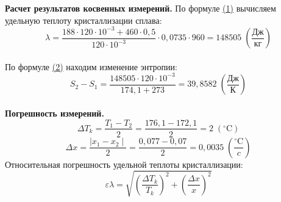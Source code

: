 \documentclass{article}
\begin{document}
\textbf{Расчет результатов косвенных измерений.}
По формуле \hyperlink{formul1}{(1)} вычисляем удельную теплоту кристаллизации сплава:
$$ \lambda=\frac{188\cdot120\cdot10^{-3} + 460\cdot0,5}{120\cdot10^{-3}}\cdot0,0735\cdot960=148505\;\left( \frac{\mbox{Дж}}{\mbox{кг}}\right)$$\\

По формуле \hyperlink{formul2}{(2)} находим изменение энтропии:
$$ S_2-S_1=\frac{148505\cdot120\cdot10^{-3}}{174,1+273}=39,8582\;\left( \frac{\mbox{Дж}}{\mbox{К}}\right)$$\\

\textbf{Погрешность измерений.}
$$\Delta T_k=\frac{T_1-T_2}{2}=\frac{176,1-172,1}{2}=2\;(^\circ\mbox{C})$$
$$ \Delta x = \frac{\mid x_1-x_2\mid}{2}=\frac{0,077-0,07}{2}=0,0035\; \left( \frac{^\circ\mbox{C}}{c}\right) $$
Относительная погрешность удельной теплоты кристаллизации:
$$ \varepsilon\lambda = \sqrt{\left( \frac{\Delta T_k}{T_k}\right)^2  + \left(\frac{\Delta x}{x}\right)^2}$$
\end{document}
